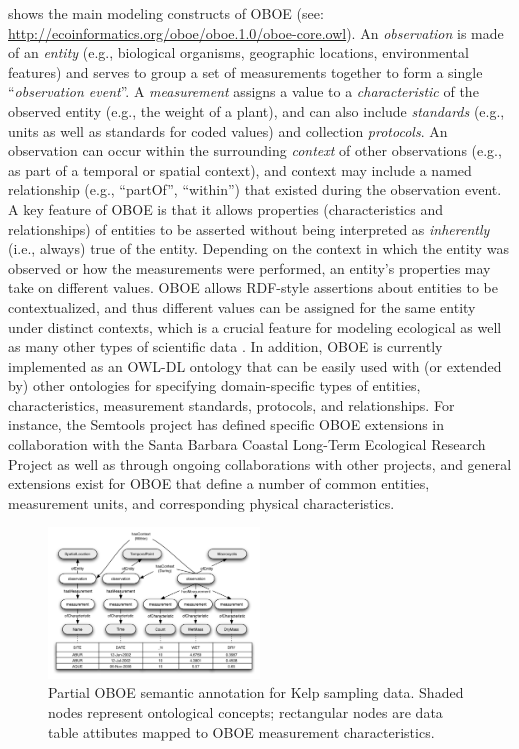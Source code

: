    shows the
main modeling constructs of OBOE (see:
\url{http://ecoinformatics.org/oboe/oboe.1.0/oboe-core.owl}). An {\em
  observation} is made of an {\em entity} (e.g., biological organisms,
geographic locations, environmental features) and serves to group a
set of measurements together to form a single ``\emph{observation
  event}''. A \emph{measurement} assigns a value to a {\em
  characteristic} of the observed entity (e.g., the weight of a
plant), and can also include \emph{standards} (e.g., units as well as
standards for coded values) and collection \emph{protocols}. An
observation can occur within the surrounding \emph{context} of other
observations (e.g., as part of a temporal or spatial context), and
context may include a named relationship (e.g., ``partOf'',
``within'') that existed during the observation event. A key feature
of OBOE is that it allows properties (characteristics and
relationships) of entities to be asserted without being interpreted as
\emph{inherently} (i.e., {always}) true of the entity.  Depending on
the context in which the entity was observed or how the measurements
were performed, an entity's properties may take on different values.
OBOE allows RDF-style assertions about entities to be contextualized,
and thus different values can be assigned for the same entity under
distinct contexts, which is a crucial feature for modeling ecological
as well as many other types of scientific data
\cite{bowers08,mungall07:_repres_phenot_in_owl}. In addition, OBOE is
currently implemented as an OWL-DL ontology that can be easily used
with (or extended by) other ontologies for specifying domain-specific
types of entities, characteristics, measurement standards, protocols,
and relationships. For instance, the Semtools project has defined
specific OBOE extensions in collaboration with the Santa Barbara
Coastal Long-Term Ecological Research Project as well as through
ongoing collaborations with other projects, and general extensions
exist for OBOE that define a number of common entities, measurement
units, and corresponding physical characteristics.

\begin{figure}[!b]
\centering
\includegraphics[width=0.5\textwidth]{images/kelp-mass-model.png}
\caption{Partial OBOE semantic annotation for Kelp sampling
  data. Shaded nodes represent ontological concepts; rectangular nodes
  are data table attibutes mapped to OBOE measurement
  characteristics.}
\label{fig:kelp-mass-model}
\end{figure}

